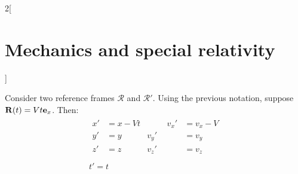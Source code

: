 \documentclass[../../../main.tex]{subfiles}
\begin{document}
\begin{multicols}{2}[\section{Mechanics and special relativity}]
\begin{prop}
  \end{prop}
  \begin{prop}
    Consider two reference frames $\mathcal{R}$ and $\mathcal{R}'$. Using the previous notation, suppose $\vb{R}(t)=Vt\vb{e}_x$. Then:
    \begin{gather*}
      \begin{aligned}
        x' & =x-Vt & \hspace{1cm} v_x' & =v_x-V \\
        y' & =y    & v_y'              & =v_y   \\
        z' & =z    & v_z'              & =v_z   \\
      \end{aligned}\\
      t'=t
    \end{gather*}
  \end{prop}

\end{multicols}
\end{document}
